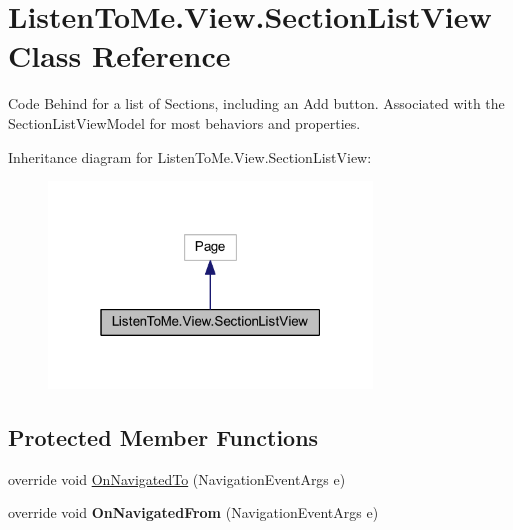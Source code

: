 \hypertarget{class_listen_to_me_1_1_view_1_1_section_list_view}{}\section{Listen\+To\+Me.\+View.\+Section\+List\+View Class Reference}
\label{class_listen_to_me_1_1_view_1_1_section_list_view}


Code Behind for a list of Sections, including an Add button. Associated with the Section\+List\+View\+Model for most behaviors and properties.  




Inheritance diagram for Listen\+To\+Me.\+View.\+Section\+List\+View\+:\nopagebreak
\begin{figure}[H]
\begin{center}
\leavevmode
\includegraphics[width=244pt]{class_listen_to_me_1_1_view_1_1_section_list_view__inherit__graph}
\end{center}
\end{figure}
\subsection*{Protected Member Functions}
\begin{DoxyCompactItemize}
\item 
override void \hyperlink{class_listen_to_me_1_1_view_1_1_section_list_view_ad9267194ab49100e5cae9f93affca914}{On\+Navigated\+To} (Navigation\+Event\+Args e)
\item 
override void {\bfseries On\+Navigated\+From} (Navigation\+Event\+Args e)\hypertarget{class_listen_to_me_1_1_view_1_1_section_list_view_a10ff8073aa01a854454856a0cee2d043}{}\label{class_listen_to_me_1_1_view_1_1_section_list_view_a10ff8073aa01a854454856a0cee2d043}

\end{DoxyCompactItemize}
